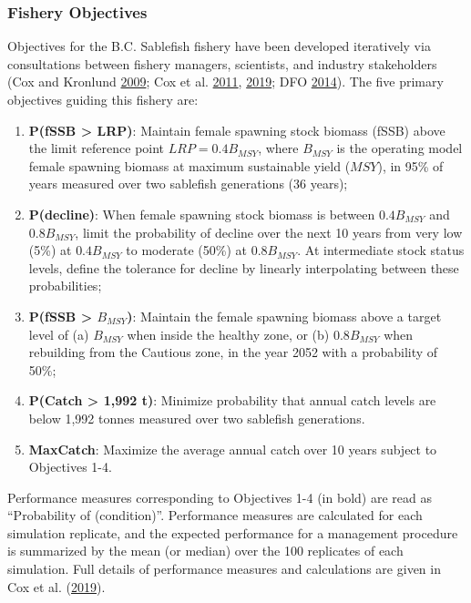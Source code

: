 \documentclass[11pt]{book}
\begin{document}
\hypertarget{fishery-objectives}{%
\subsubsection{Fishery Objectives}\label{fishery-objectives}}

Objectives for the B.C. Sablefish fishery have been developed iteratively via consultations between fishery managers, scientists, and industry stakeholders (Cox and Kronlund \protect\hyperlink{ref-cox2009evaluation}{2009}; Cox et al. \protect\hyperlink{ref-cox2011management}{2011}, \protect\hyperlink{ref-cox2019evaluating}{2019}; DFO \protect\hyperlink{ref-dfo2014performanc}{2014}). The five primary objectives guiding this fishery are:
\begin{enumerate}
\def\labelenumi{\arabic{enumi}.}

\item
  \textbf{P(fSSB \textgreater{} LRP)}: Maintain female spawning stock biomass (fSSB) above the limit reference point \(LRP = 0.4B_{MSY}\), where \(B_{MSY}\) is the operating model female spawning biomass at maximum sustainable yield (\(MSY\)), in 95\% of years measured over two sablefish generations (36 years);
\item
  \textbf{P(decline)}: When female spawning stock biomass is between \(0.4B_{MSY}\) and \(0.8B_{MSY}\), limit the probability of decline over the next 10 years from very low (5\%) at \(0.4B_{MSY}\) to moderate (50\%) at \(0.8B_{MSY}\). At intermediate stock status levels, define the tolerance for decline by linearly interpolating between these probabilities;
\item
  \textbf{P(fSSB \textgreater{} \(B_{MSY}\))}: Maintain the female spawning biomass above a target level of (a) \(B_{MSY}\) when inside the healthy zone, or (b) \(0.8B_{MSY}\) when rebuilding from the Cautious zone, in the year 2052 with a probability of 50\%;
\item
  \textbf{P(Catch \textgreater{} 1,992 t)}: Minimize probability that annual catch levels are below 1,992 tonnes measured over two sablefish generations.
\item
  \textbf{MaxCatch}: Maximize the average annual catch over 10 years subject to Objectives 1-4.
\end{enumerate}
Performance measures corresponding to Objectives 1-4 (in bold) are read as ``Probability of (condition)''. Performance measures are calculated for each simulation replicate, and the expected performance for a management procedure is summarized by the mean (or median) over the 100 replicates of each simulation. Full details of performance measures and calculations are given in Cox et al. (\protect\hyperlink{ref-cox2019evaluating}{2019}).
\end{document}
